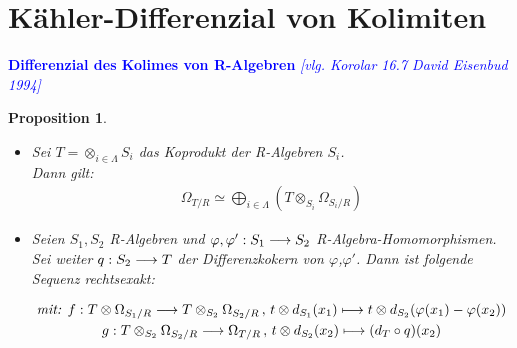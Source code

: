 \documentclass[10pt,a4paper]{report}
\newcommand{\comment}[1]{}
\newcommand{\ModulsOfDifferenzials}{David Eisenbud 1994}
\newcounter{Aussage}[chapter]
\newtheorem{prop}[Aussage]{Proposition}
\newcommand{\functionfront}[3]{\nolinebreak{#1:#2 \longrightarrow #3}}
\newcommand{\function}[5]{\nolinebreak{#1:#2 \longrightarrow #3 \, , \, #4 \longmapsto #5}}
\newcommand{\divR}[2]{\Omega_{#1/#2}}
\newcommand{\divf}[1]{d_{#1}}
\newcommand{\Tensor}[3]{#1 \otimes_{#2} #3}
\newcommand{\tensor}[3]{#1 \otimes #3}
\begin{document}
\section{Kähler-Differenzial von Kolimiten}
\textcolor{blue}{\textbf{Differenzial des Kolimes von R-Algebren} \textit{[vlg. Korolar 16.7 \ModulsOfDifferenzials]}}
\comment{Beide Beweise sind sehr kurz gefasst}
\begin{prop} \label{Differenzial des Kolimes von R-Algebren}
\ \\
\begin{itemize}
\item[\textbf{1.}]
Sei $T = \otimes_{i \in \Lambda} S_i$ das Koprodukt der R-Algebren $S_i$.\\
Dann gilt:
\begin{gather*}
\divR{T}{R} \simeq \bigoplus_{i\in \Lambda} ( \Tensor{T}{S_i}{\divR{S_i}{R}} )
\end{gather*}
\item[\textbf{2.}]
Seien $S_1,S_2$ R-Algebren und $\functionfront{\varphi,\varphi'}{S_1}{S_2}$ R-Algebra-Homomorphismen. Sei weiter $\functionfront{q}{S_2}{T}$ der Differenzkokern von $\varphi$,$\varphi '$.
Dann ist folgende Sequenz rechtsexakt:
\begin{center}
\begin{gather*}
\textit{mit: } \function{f}{\tensor{T}{S_1}{\divR{S_1}{R}}}{\Tensor{T}{S_2}{\divR{S_2}{R}}}{\tensor{t}{S_2}{\divf{S_1}(x_1)}}{\tensor{t}{S_2}{\divf{S_2}(\varphi(x_1) - \varphi(x_2))}}\\
\function{g}{\Tensor{T}{S_2}{\divR{S_2}{R}}}{\divR{T}{R}}{\tensor{t}{S_2}{\divf{S_2}(x_2)}}{(\divf{T}\circ q)(x_2)}
\end{gather*}
\end{center}
\end{itemize}
\end{prop}
\end{document}
